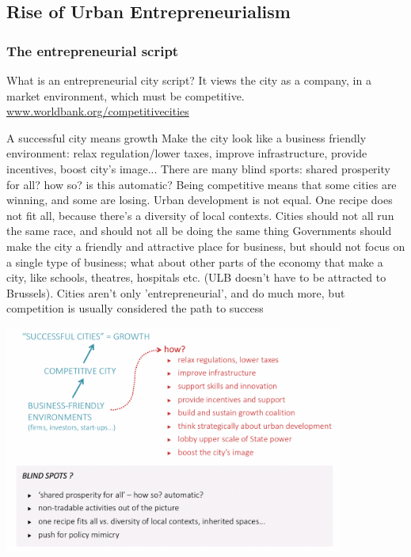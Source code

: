 \documentclass{article}
\begin{document}
\subsection{Rise of Urban Entrepreneurialism}

\subsubsection{The entrepreneurial script}

What is an entrepreneurial city script? It views the city as a company, in a market environment, which must be competitive.
\url{www.worldbank.org/competitivecities}

\begin{outline}
	\1 A successful city means growth
	\1 Make the city look like a business friendly environment: relax regulation/lower taxes, improve infrastructure, provide incentives, boost city's image...
	\1 There are many blind sports: shared prosperity for all? how so? is this automatic? Being competitive means that some cities are winning, and some are losing. Urban development is not equal. 
	\1 One recipe does not fit all, because there's a diversity of local contexts. Cities should not all run the same race, and should not all be doing the same thing
	\1 Governments should make the city a friendly and attractive place for business, but should not focus on a single type of business; what about other parts of the economy that make a city, like schools, theatres, hospitals etc. (ULB doesn't have to be attracted to Brussels).
Cities aren't only 'entrepreneurial', and do much more, but competition is usually considered the path to success
\end{outline}

\begin{center}
\includegraphics[width=30em]{entrepreneurial_script}
\end{center}
\end{document}
